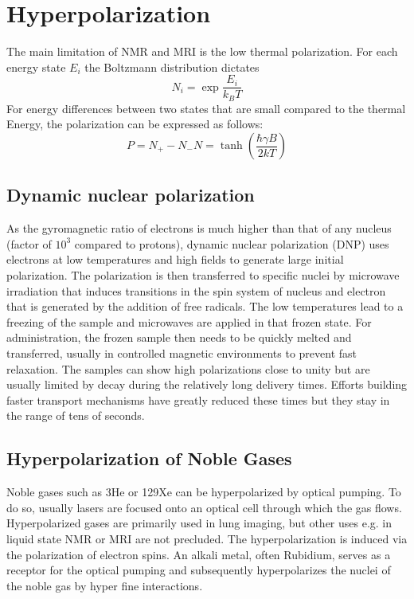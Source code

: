     \section{Hyperpolarization}
        The main limitation of NMR and MRI is the low thermal polarization.  For each energy state $E_i$ the Boltzmann distribution dictates
        \begin{equation}
            N_i = \exp{\frac{E_i}{k_B T}}
        \end{equation}
        For energy differences between two states that are small compared to the thermal Energy, the polarization can be expressed as follows:
        \begin{equation}
            P = {N_+-N_-}{N} = \tanh\left(\frac{\hbar \gamma B}{2 k T }\right)
            \label{equation:theory:polarization}
        \end{equation}
        \subsection{Dynamic nuclear polarization}
            As the gyromagnetic ratio of electrons is much higher than that of any nucleus (factor of $10^{3}$ compared to protons), dynamic nuclear polarization (DNP) uses electrons at low temperatures and high fields to generate large initial polarization. The polarization is then transferred to specific nuclei by microwave irradiation that induces transitions in the spin system of nucleus and electron that is generated by the addition of free radicals. The low temperatures lead to a freezing of the sample and microwaves are applied in that frozen state. For administration, the frozen sample then needs to be quickly melted and transferred, usually in controlled magnetic environments to prevent fast relaxation. The samples can show high polarizations close to unity but are usually limited by decay during the relatively long delivery times. Efforts building faster transport mechanisms have greatly reduced these times but they stay in the range of tens of seconds.
        \subsection{Hyperpolarization of Noble Gases}
            Noble gases such as 3He or 129Xe can be hyperpolarized by optical pumping. To do so, usually lasers are focused onto an optical cell through which the gas flows. Hyperpolarized gases are primarily used in lung imaging, but other uses e.g. in liquid state NMR or MRI are not precluded.
            The hyperpolarization is induced via the polarization of electron spins. An alkali metal, often Rubidium, serves as a receptor for the optical pumping and subsequently hyperpolarizes the nuclei of the noble gas by hyper fine interactions.
